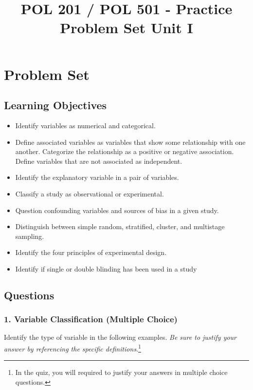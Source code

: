 \documentclass{article}
\title{POL 201 / POL 501 - Practice Problem Set Unit I}
\author{}
\date{}
\begin{document}
\maketitle

\section*{Problem Set}

\subsection*{Learning Objectives}

\begin{itemize}
    \item Identify variables as numerical and categorical.
    \item Define associated variables as variables that show some relationship with one another. Categorize the relationship as a positive or negative association. Define variables that are not associated as independent.
    \item Identify the explanatory variable in a pair of variables.
    \item Classify a study as observational or experimental.
    \item Question confounding variables and sources of bias in a given study.
    \item Distinguish between simple random, stratified, cluster, and multistage sampling.
    \item Identify the four principles of experimental design.
    \item Identify if single or double blinding has been used in a study
\end{itemize}

\subsection*{Questions}

\subsubsection*{1. Variable Classification (Multiple Choice)}
Identify the type of variable in the following examples. \emph{Be sure to justify your answer by referencing the specific definitions}.\footnote{In the quiz, you will required to justify your answers in multiple choice questions.}
\end{document}
